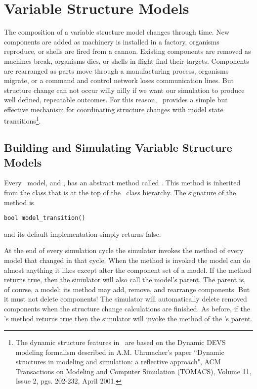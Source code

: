 \chapter{Variable Structure Models}
The composition of a variable structure model changes through time. New components are added as machinery is installed in a factory, organisms reproduce, or shells are fired from a cannon. Existing components are removed as machines break, organisms dies, or shells in flight find their targets. Components are rearranged as parts move through a manufacturing process, organisms migrate, or a command and control network loses communication lines. But structure change can not occur willy nilly if we want our simulation to produce well defined, repeatable outcomes. For this reason, \adevs\ provides a simple but effective mechanism for coordinating structure changes with model state transitions\footnote{The dynamic structure features in \adevs\ are based on the Dynamic DEVS modeling formalism described in A.M. Uhrmacher's paper ``Dynamic structures in modeling and simulation: a reflective approach", ACM Transactions on Modeling and Computer Simulation (TOMACS), Volume 11, Issue 2, pgs. 202-232, April 2001.}.

\section{Building and Simulating Variable Structure Models}
Every \adevs\ model,  and , has an abstract method called . This method is inherited from the  class that is at the top of the \adevs\ class hierarchy. The signature of the  method is
\begin{verbatim}
bool model_transition()
\end{verbatim}
and its default implementation simply returns false.

At the end of every simulation cycle the simulator invokes the  method of every  model that changed in that cycle. When the  method is invoked the  model can do almost anything it likes except alter the component set of a  model.
If the  method returns true, then the simulator will also call the model's parent.
The parent is, of course, a  model; its  method may add, remove, and rearrange components. But it must not delete components! The simulator will automatically delete removed components when the structure change calculations are finished. As before, if the 's  method returns true then the simulator will invoke the  method of the 's parent.

